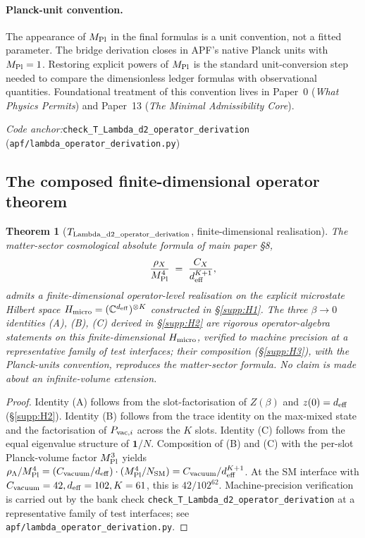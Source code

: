 \documentclass[11pt]{article}
\theoremstyle{plain}
\newtheorem{theorem}{Theorem}[section]
\theoremstyle{definition}
\theoremstyle{remark}
\newcommand{\Mpl}{M_{\rm Pl}}
\newcommand{\paperref}[2]{Paper~#1 (\emph{#2})}
\newcommand{\coderef}[2]{\par\noindent\textit{Code anchor:}\quad\texttt{#1} (\texttt{#2})}
\begin{document}
\paragraph{Planck-unit convention.}  The appearance of $\Mpl$ in the final formulas is a unit convention, not a fitted parameter.  The bridge derivation closes in APF's native Planck units with $\Mpl = 1$.  Restoring explicit powers of $\Mpl$ is the standard unit-conversion step needed to compare the dimensionless ledger formulas with observational quantities.  Foundational treatment of this convention lives in \paperref{0}{What Physics Permits} and \paperref{13}{The Minimal Admissibility Core}.

\coderef{check\_T\_Lambda\_d2\_operator\_derivation}{apf/lambda\_operator\_derivation.py}

\bigskip

\subsection{The composed finite-dimensional operator theorem}\label{supp:H4}

\begin{theorem}[$T_{\rm Lambda\_d2\_operator\_derivation}$, finite-dimensional realisation]\label{thm:operator_level}
The matter-sector cosmological absolute formula of main paper \S8,
\[
  \frac{\rho_X}{\Mpl^4} \;=\; \frac{C_X}{d_{\rm eff}^{K+1}},
\]
admits a \emph{finite-dimensional} operator-level realisation on the explicit microstate Hilbert space $H_{\rm micro} = (\mathbb{C}^{d_{\rm eff}})^{\otimes K}$ constructed in \S\ref{supp:H1}.  The three $\beta \to 0$ identities (A), (B), (C) derived in \S\ref{supp:H2} are rigorous operator-algebra statements on this finite-dimensional $H_{\rm micro}$, verified to machine precision at a representative family of test interfaces; their composition (\S\ref{supp:H3}), with the Planck-units convention, reproduces the matter-sector formula.  No claim is made about an infinite-volume extension.
\end{theorem}

\begin{proof}
Identity (A) follows from the slot-factorisation of $Z(\beta)$ and $z(0) = d_{\rm eff}$ (\S\ref{supp:H2}).  Identity (B) follows from the trace identity on the max-mixed state and the factorisation of $P_{{\rm vac},i}$ across the $K$ slots.  Identity (C) follows from the equal eigenvalue structure of $\mathbf{1}/N$.  Composition of (B) and (C) with the per-slot Planck-volume factor $\Mpl^3$ yields $\rho_\Lambda / \Mpl^4 = (C_{\rm vacuum}/d_{\rm eff}) \cdot (\Mpl^4 / N_{\rm SM}) = C_{\rm vacuum}/d_{\rm eff}^{K+1}$.  At the SM interface with $C_{\rm vacuum} = 42, d_{\rm eff} = 102, K = 61$, this is $42/102^{62}$.  Machine-precision verification is carried out by the bank check \texttt{check\_T\_Lambda\_d2\_operator\_derivation} at a representative family of test interfaces; see \texttt{apf/lambda\_operator\_derivation.py}.
\end{proof}
\end{document}
